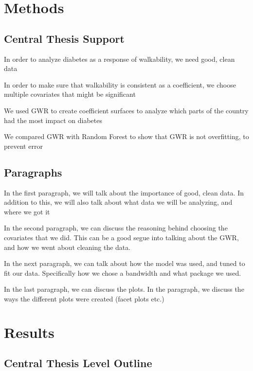 \documentclass[
]{article}
\begin{document}
\section{Methods}\label{methods}

\subsection{Central Thesis Support}\label{central-thesis-support-1}

In order to analyze diabetes as a response of walkability, we need good,
clean data

In order to make sure that walkability is consistent as a coefficient,
we choose multiple covariates that might be significant

We used GWR to create coefficient surfaces to analyze which parts of the
country had the most impact on diabetes

We compared GWR with Random Forest to show that GWR is not overfitting,
to prevent error

\subsection{Paragraphs}\label{paragraphs}

In the first paragraph, we will talk about the importance of good, clean
data. In addition to this, we will also talk about what data we will be
analyzing, and where we got it

In the second paragraph, we can discuss the reasoning behind choosing
the covariates that we did. This can be a good segue into talking about
the GWR, and how we went about cleaning the data.

In the next paragraph, we can talk about how the model was used, and
tuned to fit our data. Specifically how we chose a bandwidth and what
package we used.

In the last paragraph, we can discuss the plots. In the paragraph, we
discuss the ways the different plots were created (facet plots etc.)

\section{Results}\label{results}

\subsection{Central Thesis Level
Outline}\label{central-thesis-level-outline}
\end{document}
